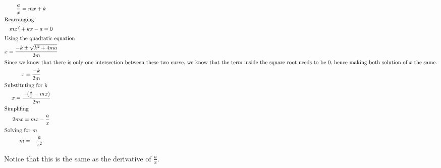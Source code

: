 \documentclass[a4paper]{article}
\begin{document}
\begin{gather*}
\frac{a}{x} = mx+k\\
\shortintertext{Rearranging}
mx^2 + kx - a = 0\\
\shortintertext{Using the quadratic equation}
x = \frac{-k \pm \sqrt{k^2 + 4ma}}{2m}\\
\shortintertext{Since we know that there is only one intersection between these two curve, we know that the term inside the square root needs to be $0$, hence making both solution of $x$ the same.}
x = \frac{-k}{2m}\\
\shortintertext{Substituting for k}
x = \frac{-(\frac{a}{x}-mx)}{2m}\\
\shortintertext{Simplifing}
2mx = mx -\frac{a}{x}\\
\shortintertext{Solving for $m$}
m = -\frac{a}{x^2}\\
\end{gather*}

Notice that this is the same as the derivative of $\frac{a}{x}$.
\end{document}

